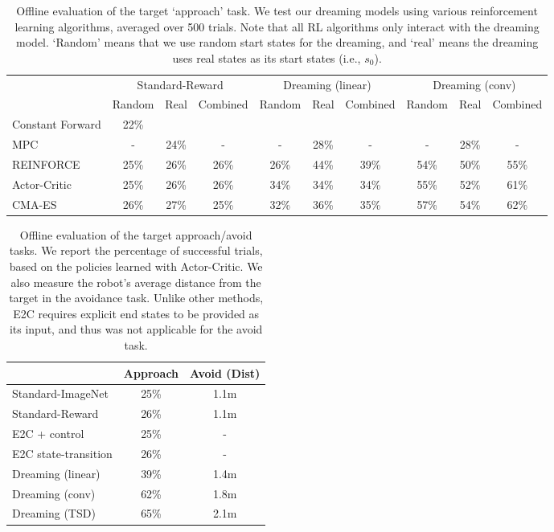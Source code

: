 \documentclass[letterpaper, 10 pt, conference]{ieeeconf}
\newcommand{\mryoo}[1]{\fxnote{\hl{Michael: #1}}}
\begin{document}
{\setlength{\tabcolsep}{0.4em}
\begin{table*}
\small
  \caption{Offline evaluation of the target `approach' task. We test our dreaming models using various reinforcement learning algorithms, averaged over 500 trials. Note that all RL algorithms only interact with the dreaming model. `Random' means that we use random start states for the dreaming, and `real' means the dreaming uses real states as its start states (i.e., $s_0$).}%
  \label{tab:off}
  \centering
  \begin{tabular}{lccccccccc}
    \toprule
     & \multicolumn{3}{c}{Standard-Reward} &    \multicolumn{3}{c}{Dreaming (linear)} & \multicolumn{3}{c}{Dreaming (conv)}               \\
    \cmidrule(r){2-4}  \cmidrule(r){5-7} \cmidrule(r){8-10}
         &  Random    & Real & Combined &   Random    & Real & Combined  &  Random    & Real & Combined  \\
    \midrule
    Constant Forward & 22\%  \\
    MPC \cite{nagabandi2017neural}            & - & 24\% & -  & - & 28\% & - & - & 28\% & - \\
    REINFORCE      & 25\% & 26\% & 26\% & 26\% & 44\% & 39\% & 54\% & 50\% & 55\% \\
    Actor-Critic   & 25\% & 26\% & 26\% & 34\% & 34\% & 34\% & 55\% & 52\% & 61\% \\
    CMA-ES \cite{hansen2003reducing}        & 26\% & 27\% & 25\% & 32\% & 36\% & 35\% & 57\% & 54\% & 62\% \\
    \bottomrule
  \end{tabular}
\end{table*}
}

\begin{table}
\small
  \caption{Offline evaluation of the target approach/avoid tasks. We report the percentage of successful trials, based on the policies learned with Actor-Critic. We also measure the robot's average distance from the target in the avoidance task. Unlike other methods, E2C requires explicit end states to be provided as its input, and thus was not applicable for the avoid task.}
  \label{tab:off-compare}
  \centering
  \begin{tabular}{lcc}
    \toprule
         &  Approach & Avoid (Dist) \\
    \midrule
     Standard-ImageNet  & 25\% & 1.1m \\
     Standard-Reward  & 26\%  & 1.1m \\
     E2C + control \cite{watter2015embed} & 25\% & - \\
     E2C state-transition & 26\% & - \\
     Dreaming (linear) & 39\% & 1.4m \\
     Dreaming (conv) & 62\% & 1.8m\\
     Dreaming (TSD)  & 65\% & 2.1m\\
    \bottomrule
  \end{tabular}
\end{table}
\end{document}
